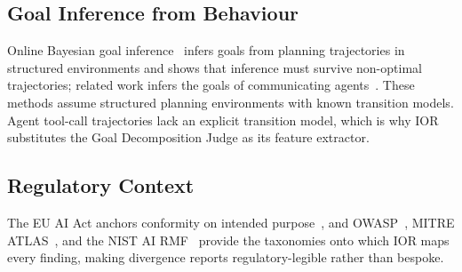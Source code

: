 \subsection{Goal Inference from Behaviour}
Online Bayesian goal inference~\citep{sips2020} infers goals from planning
trajectories in structured environments and shows that inference must survive
non-optimal trajectories; related work infers the goals of communicating
agents~\citep{communicatingAgents2023}. These methods assume structured planning
environments with known transition models. Agent tool-call trajectories lack an
explicit transition model, which is why IOR substitutes the Goal Decomposition
Judge as its feature extractor.

\subsection{Regulatory Context}
The EU AI Act anchors conformity on intended purpose~\citep{euAIAct2024}, and
OWASP~\citep{owaspASI2025}, MITRE ATLAS~\citep{mitreAtlas}, and the NIST AI
RMF~\citep{nistRMF2026} provide the taxonomies onto which IOR maps every finding,
making divergence reports regulatory-legible rather than bespoke.
